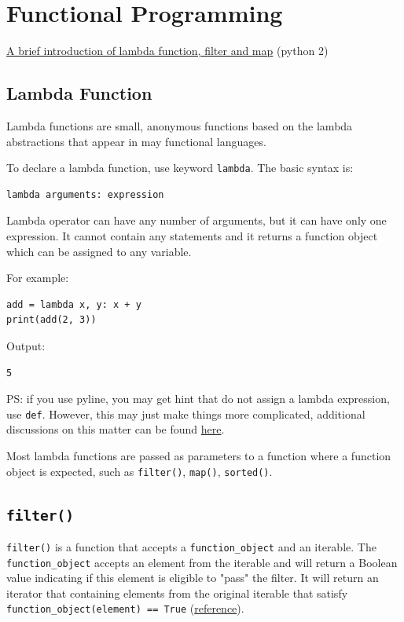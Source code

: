 \documentclass[12pt]{book}
\begin{document}
\chapter{Functional Programming}
\label{sec:orga84cef8}
\href{https://medium.com/@happymishra66/lambda-map-and-filter-in-python-4935f248593}{A brief introduction of lambda function, filter and map} (python 2)

\section{Lambda Function}
\label{sec:org6fac241}
Lambda functions are small, anonymous functions based on the lambda abstractions that appear in may functional languages.

To declare a lambda function, use keyword \texttt{lambda}. The basic syntax is:
\begin{verbatim}
lambda arguments: expression
\end{verbatim}
Lambda operator can have any number of arguments, but it can have only one expression. It cannot contain any statements and it returns a function object which can be assigned to any variable.

For example:
\begin{verbatim}
add = lambda x, y: x + y
print(add(2, 3))
\end{verbatim}
Output:
\begin{verbatim}
5
\end{verbatim}
PS: if you use pyline, you may get hint that do not assign a lambda expression, use \texttt{def}. However, this may just make things more complicated, additional discussions on this matter can be found \href{https://stackoverflow.com/questions/25010167/e731-do-not-assign-a-lambda-expression-use-a-def}{here}.

Most lambda functions are passed as parameters to a function where a function object is expected, such as \texttt{filter()}, \texttt{map()}, \texttt{sorted()}.
\section{\texttt{filter()}}
\label{sec:org0ca7fd6}
\texttt{filter()} is a function that accepts a \texttt{function\_object} and an iterable. The \texttt{function\_object} accepts an element from the iterable and will return a Boolean value indicating if this element is eligible to "pass" the filter. It will return an iterator that containing elements from the original iterable that satisfy \texttt{function\_object(element) == True} (\href{https://stackoverflow.com/questions/12319025/filters-in-python3}{reference}).
\end{document}
